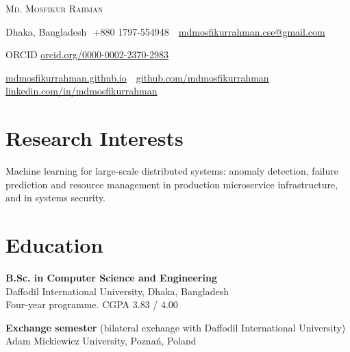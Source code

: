 \documentclass[a4paper,11pt]{article}
\let\origsection\section
\renewcommand{\section}[1]{\needspace{7\baselineskip}\origsection{#1}}
\newenvironment{datedlist}
  {\begin{list}{}{%
     \setlength{\leftmargin}{3.3cm}\setlength{\labelwidth}{2.9cm}
     \setlength{\labelsep}{0.4cm}\setlength{\itemsep}{5pt}
     \setlength{\parsep}{0pt}\setlength{\topsep}{4pt}
     \renewcommand{\makelabel}[1]{##1\hfill}}%
   \interlinepenalty=10000 }
  {\end{list}}
\begin{document}
\thispagestyle{firstpage}

\newcommand{\sep}{\,\textperiodcentered\,}

\begin{center}
  {\Huge\scshape Md. Mosfikur Rahman}

  \vspace{5pt}
  {\small
   Dhaka, Bangladesh \sep +880 1797-554948 \sep
   \href{mailto:mdmosfikurrahman.cse@gmail.com}{mdmosfikurrahman.cse@gmail.com}}

  \vspace{2pt}
  {\small ORCID \href{https://orcid.org/0000-0002-2370-2983}{orcid.org/0000-0002-2370-2983}}

  \vspace{2pt}
  {\small
   \href{https://mdmosfikurrahman.github.io}{mdmosfikurrahman.github.io}
   \sep
   \href{https://github.com/mdmosfikurrahman}{github.com/mdmosfikurrahman}
   \sep
   \href{https://linkedin.com/in/mdmosfikurrahman}{linkedin.com/in/mdmosfikurrahman}}
\end{center}

\vspace{-2pt}

\section{Research Interests}

Machine learning for large-scale distributed systems: anomaly detection, failure prediction
and resource management in production microservice infrastructure, and in systems security.

\section{Education}

\begin{datedlist}
\item[2018 -- 2021] \textbf{B.Sc. in Computer Science and Engineering}\\
  Daffodil International University, Dhaka, Bangladesh\\
  Four-year programme. CGPA 3.83 / 4.00

\item[2021] \textbf{Exchange semester} (bilateral exchange with Daffodil International University)\\
  Adam Mickiewicz University, Pozna\'n, Poland
\end{datedlist}
\end{document}
